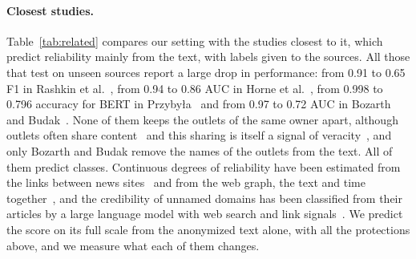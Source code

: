 \documentclass[11pt,a4paper]{article}
\begin{document}
\paragraph{Closest studies.} Table~\ref{tab:related} compares our setting with the studies closest to it, which predict
reliability mainly from the text, with labels given to the sources. All those that test on unseen sources report a large
drop in performance: from 0.91 to 0.65 F1 in Rashkin et al.~\cite{rashkin2017truth}, from 0.94 to 0.86 AUC in Horne et
al.~\cite{horne2019robust}, from 0.998 to 0.796 accuracy for BERT in Przyby{\l}a~\cite{przybyla2020capturing} and from
0.97 to 0.72 AUC in Bozarth and Budak~\cite{bozarth2020toward}. None of them keeps the outlets of the same owner apart,
although outlets often share content~\cite{horne2019spirals} and this sharing is itself a signal of
veracity~\cite{gruppi2021tell}, and only Bozarth and Budak remove the names of the outlets from the text. All of them
predict classes. Continuous degrees of reliability have been estimated from the links between news
sites~\cite{burdisso-etal-2024-reliability} and from the web graph, the text and time together~\cite{kondrup2026credibench},
and the credibility of unnamed domains has been classified from their articles by a large language model with web search
and link signals~\cite{eldifrawi2026temporal}. We predict the score on its full scale from the anonymized text alone,
with all the protections above, and we measure what each of them changes.
\end{document}
